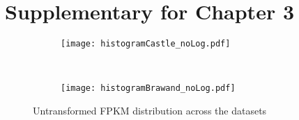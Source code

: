 \chapter{Supplementary for Chapter 3}
\label{ch:SupplExpress}


\begin{figure}[htbp]
    \centering
    \begin{subfigure}[b]{0.45\textwidth} %
        \centering \texttt{[image: histogramCastle\_noLog.pdf]}
        \caption{}\label{fig:histCastle_nolog}
    \end{subfigure}
~ %
    \begin{subfigure}[b]{0.45\textwidth} %
          \centering \texttt{[image: histogramBrawand\_noLog.pdf]}
          \caption{}\label{fig:histBrawand_nolog}
      \end{subfigure}
\caption{Untransformed FPKM distribution across the
    datasets}\label{fig:unscaledDistrib}
\end{figure}


